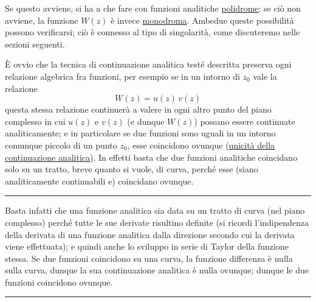 \documentclass[11pt, a4paper]{book}
\numberwithin{equation}{section}
\begin{document}
Se questo avviene, si ha a che fare con funzioni analitiche \uline{polidrome}; se ciò non avviene, la funzione $W(z)$ è invece \uline{monodroma}. Ambedue queste possibilità possono verificarsi; ciò è connesso al tipo di singolarità, come discuteremo nelle sezioni seguenti.

È ovvio che la tecnica di continuazione analitica testé descritta preserva ogni relazione algebrica fra funzioni, per esempio se in un intorno di $z_0$ vale la relazione
\begin{equation}
W(z) = u(z)\, v(z) \tag{11}
\end{equation}
questa stessa relazione continuerà a valere in ogni altro punto del piano complesso in cui $u(z)$ e $v(z)$ (e dunque $W(z)$) possano essere continuate analiticamente; e in particolare se due funzioni sono uguali in un intorno comunque piccolo di un punto $z_0$, esse coincidono ovunque (\uline{unicità della continuazione analitica}). In effetti basta che due funzioni analitiche coincidano solo su un tratto, breve quanto si vuole, di curva, perché esse (siano analiticamente continuabili e) coincidano ovunque.

\medskip\hrule\medskip

Basta infatti che una funzione analitica sia data su un tratto di curva (nel piano complesso) perché tutte le sue derivate risultino definite (si ricordi l'indipendenza della derivata di una funzione analitica dalla direzione secondo cui la derivata viene effettuata); e quindi anche lo sviluppo in serie di Taylor della funzione stessa. Se due funzioni coincidono su una curva, la funzione differenza è nulla sulla curva, dunque la sua continuazione analitica è nulla ovunque; dunque le due funzioni coincidono ovunque.

\medskip\hrule\medskip
\end{document}

